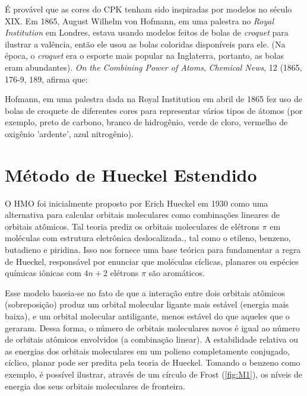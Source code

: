 É provável que as cores do CPK tenham sido inspiradas por modelos no século XIX. Em 1865, August Wilhelm von Hofmann, em uma palestra no \textit{Royal Institution} em Londres, estava usando modelos feitos de bolas de \textit{croquet} para ilustrar a valência, então ele usou as bolas coloridas disponíveis para ele. (Na época, o \textit{croquet} era o esporte mais popular na Inglaterra, portanto, as bolas eram abundantes). \textit{On the Combining Power of Atoms}, \textit{Chemical News}, 12 (1865, 176-9, 189, afirma que:

\begin{citacao}
Hofmann, em uma palestra dada na Royal Institution em abril de 1865 fez uso de bolas de croquete de diferentes cores para representar vários tipos de átomos (por exemplo, preto de carbono, branco de hidrogênio, verde de cloro, vermelho de oxigênio 'ardente', azul nitrogênio)\autocite{Crossland2004-ll}.
\end{citacao}

\section{Método de Hueckel Estendido}

O \gls{HMO} foi inicialmente proposto por Erich Hueckel em 1930 \autocite{Hckel1931} como uma alternativa para calcular orbitais moleculares como combinações lineares de orbitais atômicos\autocite{Coulson1978-ot}. Tal teoria prediz os orbitais moleculares de elétrons $\pi$ em moléculas com estrutura eletrônica deslocalizada., tal como o etileno, benzeno, butadieno e piridina. Isso nos fornece uma base teórica para fundamentar a regra de Hueckel, responsável por enunciar que moléculas cíclicas, planares ou espécies químicas iônicas com $4n + 2$ elétrons $\pi$ são aromáticos.

Esse modelo baseia-se no fato de que a interação entre dois orbitais atômicos (sobreposição) produz um orbital molecular ligante mais estável (energia mais baixa), e um orbital molecular antiligante, menos estável do que aqueles que o geraram. Dessa forma, o número de orbitais moleculares novos é igual ao número de orbitais atômicos envolvidos (a combinação linear). A estabilidade relativa ou as energias dos orbitais moleculares em um polieno completamente conjugado, cíclico, planar pode ser predita pela teoria de Hueckel. Tomando o benzeno como exemplo, é possível ilustrar, através de um círculo de Frost (\autoref{fig:M1}), os níveis de energia dos seus orbitais moleculares de fronteira.


